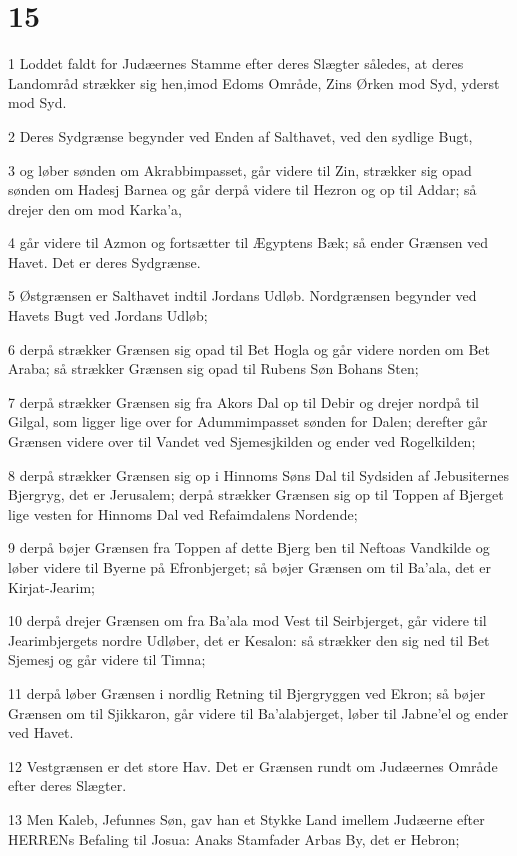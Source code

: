 \chapter{15}

\par 1 Loddet faldt for Judæernes Stamme efter deres Slægter således, at deres Landområd strækker sig hen,imod Edoms Område, Zins Ørken mod Syd, yderst mod Syd.
\par 2 Deres Sydgrænse begynder ved Enden af Salthavet, ved den sydlige Bugt,
\par 3 og løber sønden om Akrabbimpasset, går videre til Zin, strækker sig opad sønden om Hadesj Barnea og går derpå videre til Hezron og op til Addar; så drejer den om mod Karka'a,
\par 4 går videre til Azmon og fortsætter til Ægyptens Bæk; så ender Grænsen ved Havet. Det er deres Sydgrænse.
\par 5 Østgrænsen er Salthavet indtil Jordans Udløb. Nordgrænsen begynder ved Havets Bugt ved Jordans Udløb;
\par 6 derpå strækker Grænsen sig opad til Bet Hogla og går videre norden om Bet Araba; så strækker Grænsen sig opad til Rubens Søn Bohans Sten;
\par 7 derpå strækker Grænsen sig fra Akors Dal op til Debir og drejer nordpå til Gilgal, som ligger lige over for Adummimpasset sønden for Dalen; derefter går Grænsen videre over til Vandet ved Sjemesjkilden og ender ved Rogelkilden;
\par 8 derpå strækker Grænsen sig op i Hinnoms Søns Dal til Sydsiden af Jebusiternes Bjergryg, det er Jerusalem; derpå strækker Grænsen sig op til Toppen af Bjerget lige vesten for Hinnoms Dal ved Refaimdalens Nordende;
\par 9 derpå bøjer Grænsen fra Toppen af dette Bjerg ben til Neftoas Vandkilde og løber videre til Byerne på Efronbjerget; så bøjer Grænsen om til Ba'ala, det er Kirjat-Jearim;
\par 10 derpå drejer Grænsen om fra Ba'ala mod Vest til Seirbjerget, går videre til Jearimbjergets nordre Udløber, det er Kesalon: så strækker den sig ned til Bet Sjemesj og går videre til Timna;
\par 11 derpå løber Grænsen i nordlig Retning til Bjergryggen ved Ekron; så bøjer Grænsen om til Sjikkaron, går videre til Ba'alabjerget, løber til Jabne'el og ender ved Havet.
\par 12 Vestgrænsen er det store Hav. Det er Grænsen rundt om Judæernes Område efter deres Slægter.
\par 13 Men Kaleb, Jefunnes Søn, gav han et Stykke Land imellem Judæerne efter HERRENs Befaling til Josua: Anaks Stamfader Arbas By, det er Hebron;
